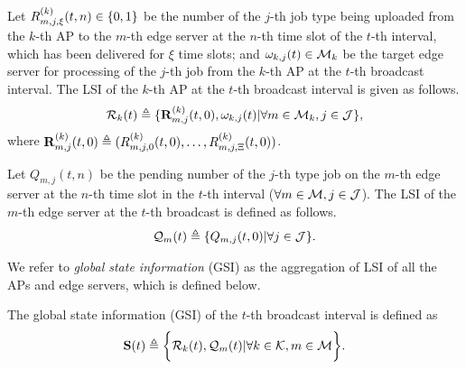 \begin{definition}
    Let $R^{(k)}_{m,j,\xi}({t,n}) \in \{0,1\}$ be the number of the $j$-th job type being uploaded from the $k$-th AP to the $m$-th edge server at the $n$-th time slot of the $t$-th interval, which has been delivered for $\xi$ time slots;
    and $\omega_{k,j}(t) \in \mathcal{M}_{k}$ be the target edge server for processing of the $j$-th job from the $k$-th AP at the $t$-th broadcast interval.
    The LSI of the $k$-th AP at the $t$-th broadcast interval is given as follows.
    \begin{align}
        \mathcal{R}_{k}(t) \triangleq \{\mathbf{R}^{(k)}_{m,j}(t,0), \omega_{k,j}(t) | \forall m\in\mathcal{M}_{k}, j\in\mathcal{J}\},
    \end{align}
    where
    $\mathbf{R}^{(k)}_{m,j}(t,0) \triangleq ( R^{(k)}_{m,j,0}(t,0), \dots, R^{(k)}_{m,j,\Xi}(t,0) )$.
\end{definition}

\begin{definition}
    Let $Q_{m,j}({t,n})$ be the pending number of the $j$-th type job on the $m$-th edge server at the $n$-th time slot in the $t$-th interval ($\forall m\in\mathcal{M}, j\in\mathcal{J}$).
    The LSI of the $m$-th edge server at the $t$-th broadcast is defined as follows.
    \begin{align}
        \mathcal{Q}_{m}(t) \triangleq \{Q_{m,j}(t, 0) | \forall j\in\mathcal{J}\}.
    \end{align}
\end{definition}

We refer to \emph{global state information} (GSI) as the aggregation of LSI of all the APs and edge servers, which is defined below.
\begin{definition}
    The global state information (GSI) of the $t$-th broadcast interval is defined as
    \begin{align}
        \mathbf{S}(t) \triangleq
            \bigg\{
                \mathcal{R}_{k}(t), \mathcal{Q}_{m}(t) | \forall k\in\mathcal{K}, m\in\mathcal{M}
            \bigg\}.
    \end{align}
\end{definition}


